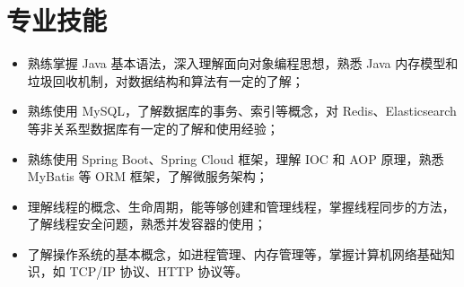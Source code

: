 \documentclass[10pt,a4paper,fontset=none]{ctexart}
\newcommand{\bodyFont}{\fontsize{9pt}{10.8pt}\selectfont}
\newenvironment{resumeItems}{%
  \begin{itemize}%
}{%
  \end{itemize}%
}
\newcommand{\resumeText}[1]{
  {\bodyFont #1}
}
\newcommand{\resumeItem}[1]{\item \resumeText{#1}}
\begin{document}
\section{专业技能}
\begin{resumeItems}
  \resumeItem{熟练掌握 Java 基本语法，深入理解面向对象编程思想，熟悉 Java 内存模型和垃圾回收机制，对数据结构和算法有一定的了解；}
  \resumeItem{熟练使用 MySQL，了解数据库的事务、索引等概念，对 Redis、Elasticsearch 等非关系型数据库有一定的了解和使用经验；}
  \resumeItem{熟练使用 Spring Boot、Spring Cloud 框架，理解 IOC 和 AOP 原理，熟悉 MyBatis 等 ORM 框架，了解微服务架构；}
  \resumeItem{理解线程的概念、生命周期，能等够创建和管理线程，掌握线程同步的方法，了解线程安全问题，熟悉并发容器的使用；}
  \resumeItem{了解操作系统的基本概念，如进程管理、内存管理等，掌握计算机网络基础知识，如 TCP/IP 协议、HTTP 协议等。}
\end{resumeItems}
\end{document}
